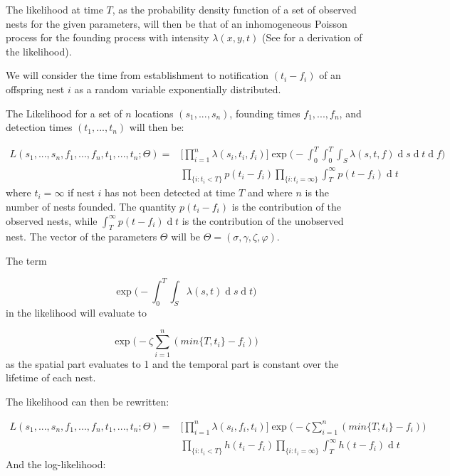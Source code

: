 \documentclass[11pt,a4paper]{article}
\renewcommand{\d}[1]{\ensuremath{\operatorname{d}\!{#1}}}
\begin{document}
The likelihood at time $T$, {\color{red}as the probability density function of a set of observed nests for the given parameters,} will then be that of an inhomogeneous Poisson process for the founding process with intensity $\lambda(x, y, t)$ {\color{red} (See \cite{Reinhart} for a derivation of the likelihood).}

We will consider the time from establishment to notification $(t_i - f_i)$ of an offspring nest $i$ as a random variable exponentially distributed.

The Likelihood for a set of $n$ locations $(s_{1}, ... , s_{n})$, founding times $f_{1}, ... , f_{n}$, and detection times $(t_{1},  ... , t_{n})$ will then be:

\begin{equation*}
\begin{aligned}
L(s_{1}, ..., s_{n}, f_{1}, ..., f_{n}, t_{1}, ..., t_{n} ; \Theta) = & \Bigg[ \prod_{i = 1}^{n} \lambda(s_{i}, t_{i}, f_{i}) \Bigg] \exp \Bigg(- \int_{0}^{T} \int_{0}^{T} \int_{S} \lambda(s, t, f) \d s \d t \d f \Bigg) \\ 
& \prod_{\{ i : t_{i} < T \} } p(t_{i} - f_{i}) \prod_{ \{ i : t_{i} = \infty \} } \int_{T}^{\infty} p(t - f_{i}) \d t
\end{aligned}
\end{equation*}
where $t_{i} = \infty$ if nest $i$ has not been detected at time $T$ and where $n$ is the number of nests founded. The quantity $p(t_{i} - f_{i})$ is the contribution of the observed nests, while $\int_{T}^{\infty} p(t - f_{i}) \d t$ is the contribution of the unobserved nest. The vector of the parameters $\Theta$ will be $\Theta = ( \sigma, \gamma, \zeta, \varphi)$.

The term 

\begin{equation}
\exp \bigg(- \int_{0}^{T} \int_{S} \lambda(s, t)\d s \d t \bigg)
\end{equation}
in the likelihood will evaluate to 


\[
\exp \bigg(- \zeta \sum_{i=1}^{n} (min\{ T, t_i \} - f_i) \bigg)
\]
as the spatial part evaluates to 1 and the temporal part is constant over the lifetime of each nest.

The likelihood can then be rewritten:

\[
\begin{aligned}
L(s_{1}, ..., s_{n}, f_{1}, ..., f_{n}, t_{1}, ..., t_{n} ; \Theta) = & \Bigg[ \prod_{i = 1}^{n} \lambda(s_{i},f_{i}, t_{i}) \Bigg] \exp \bigg(-\zeta \sum_{i=1}^{n} (min\{ T, t_i \} - f_i) \bigg) \\
& \prod_{\{ i : t_{i} < T \} }  h (t_{i} - f_{i}) \prod_{ \{ i : t_{i} = \infty \} } \int_{T}^{\infty} h(t - f_{i}) \d t
\end{aligned}
\]
And the log-likelihood:
\end{document}
